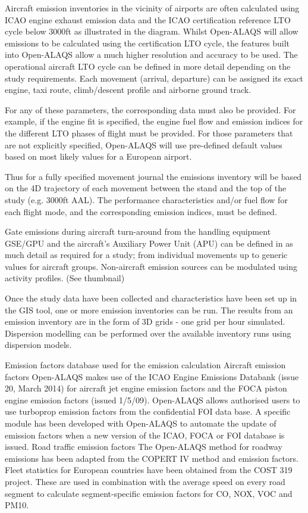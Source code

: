 \documentclass[a4paper,12pt,twoside]{article}
\begin{document}
    Aircraft emission inventories in the vicinity of airports are often calculated using ICAO engine exhaust emission data and the ICAO certification reference LTO cycle below 3000ft as illustrated in the diagram. Whilst Open-ALAQS will allow emissions to be calculated using the certification LTO cycle, the features built into Open-ALAQS allow a much higher resolution and accuracy to be used. The operational aircraft LTO cycle can be defined in more detail depending on the study requirements. Each movement (arrival, departure) can be assigned its exact engine, taxi route, climb/descent profile and airborne ground track. 
    
    For any of these parameters, the corresponding data must also be provided. For example, if the engine fit is specified, the engine fuel flow and emission indices for the different LTO phases of flight must be provided. For those parameters that are not explicitly specified, Open-ALAQS will use pre-defined default values based on most likely values for a European airport.
    
    Thus for a fully specified movement journal the emissions inventory will be based on the 4D trajectory of each movement between the stand and the top of the study (e.g. 3000ft AAL). The performance characteristics and/or fuel flow for each flight mode, and the corresponding emission indices, must be defined.
    
    Gate emissions during aircraft turn-around from the handling equipment GSE/GPU and the aircraft’s Auxiliary Power Unit (APU) can be defined in as much detail as required for a study; from individual movements up to generic values for aircraft groups. Non-aircraft emission sources can be modulated using activity profiles. (See thumbnail)
    
    Once the study data have been collected and characteristics have been set up in the GIS tool, one or more emission inventories can be run. The results from an emission inventory are in the form of 3D grids - one grid per hour simulated. Dispersion modelling can be performed over the available inventory runs using dispersion models.
    
    Emission factors database used for the emission calculation
    Aircraft emission factors	Open-ALAQS makes use of the ICAO Engine Emissions Databank (issue 20, March 2014) for aircraft jet engine emission factors and the FOCA piston engine emission factors (issued 1/5/09). Open-ALAQS allows authorised users to use turboprop emission factors from the confidential FOI data base. A specific module has been developed with Open-ALAQS to automate the update of emission factors when a new version of the ICAO, FOCA or FOI database is issued.
    Road traffic emission factors	
    The Open-ALAQS method for roadway emissions has been adapted from the COPERT IV method and emission factors. Fleet statistics for European countries have been obtained from the COST 319 project. These are used in combination with the average speed on every road segment to calculate segment-specific emission factors for CO, NOX, VOC and PM10.
\end{document}
